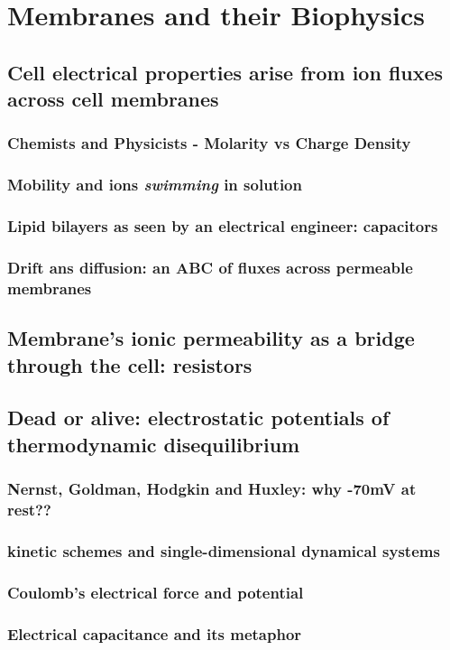 \chapter{Membranes and their Biophysics}
\label{biophys} %

\section{Cell electrical properties arise from ion fluxes across cell membranes}

\subsection{Chemists and Physicists - Molarity vs Charge Density}

\subsection{Mobility and ions \textit{swimming} in solution}


\subsection{Lipid bilayers as seen by an electrical engineer: capacitors}

\subsection{Drift ans diffusion: an ABC of fluxes across permeable membranes}

\section{Membrane’s ionic permeability as a bridge through the cell: resistors}

\section{Dead or alive: electrostatic potentials of thermodynamic disequilibrium}

\subsection{Nernst, Goldman, Hodgkin and Huxley: why -70mV at rest??}

\subsection{kinetic schemes and single-dimensional dynamical systems}

\subsection{Coulomb’s electrical force and potential}
\subsection{Electrical capacitance and its metaphor}